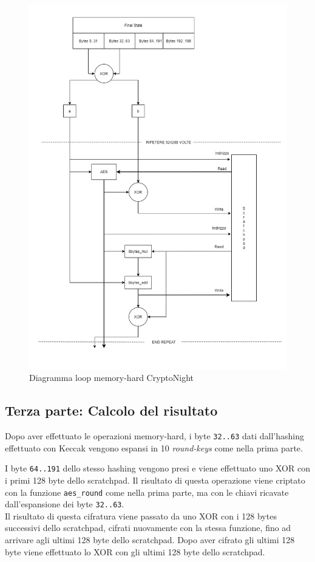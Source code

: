 \begin{figure}[h]
  \centering
  \includegraphics[width = 1\textwidth]{image_pt2.png}
  \caption{Diagramma loop memory-hard CryptoNight}
  \label{fig:my_label}
\end{figure}

\subsection{Terza parte: Calcolo del
risultato}\label{terza-parte-calcolo-del-risultato}

Dopo aver effettuato le operazioni memory-hard, i byte \texttt{32..63}
dati dall'hashing effettuato con Keccak vengono espansi in 10
\emph{round-keys} come nella prima parte.

I byte \texttt{64..191} dello stesso hashing vengono presi e viene
effettuato uno XOR con i primi 128 byte dello scratchpad. Il risultato
di questa operazione viene criptato con la funzione \texttt{aes\_round}
come nella prima parte, ma con le chiavi ricavate dall'espansione dei
byte \texttt{32..63}.\\
Il risultato di questa cifratura viene passato da uno XOR con i 128
bytes successivi dello scratchpad, cifrati nuovamente con la stessa
funzione, fino ad arrivare agli ultimi 128 byte dello scratchpad. Dopo
aver cifrato gli ultimi 128 byte viene effettuato lo XOR con gli ultimi
128 byte dello scratchpad.

